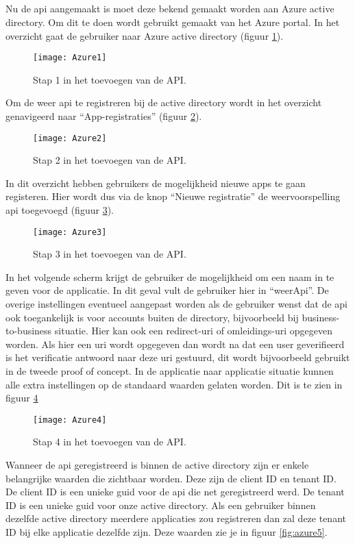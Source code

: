 \subsection{}
Nu de api aangemaakt is moet deze bekend gemaakt worden aan Azure active directory. Om dit te doen wordt gebruikt gemaakt van het Azure portal. In het overzicht gaat de gebruiker naar Azure active directory (figuur \ref{fig:azure1}).
\begin{figure}[H]
	\centering
	\texttt{[image: Azure1]} 
	\caption[BeginAzure]{Stap 1 in het toevoegen van de API.}
	\label{fig:azure1}
\end{figure}
Om de weer api te registreren bij de active directory wordt in het overzicht genavigeerd naar “App-registraties” (figuur \ref{fig:azure2}).
\begin{figure}[H]
	\centering
	\texttt{[image: Azure2]} 
	\caption[Azure2]{Stap 2 in het toevoegen van de API.}
	\label{fig:azure2}
\end{figure}
In dit overzicht hebben gebruikers de mogelijkheid nieuwe apps te gaan registeren. Hier wordt dus via de knop “Nieuwe registratie” de weervoorspelling api toegevoegd (figuur \ref{fig:azure3}).
\begin{figure}[H]
	\centering
	\texttt{[image: Azure3]} 
	\caption[Azure3]{Stap 3 in het toevoegen van de API.}
	\label{fig:azure3}
\end{figure}
In het volgende scherm krijgt de gebruiker de mogelijkheid om een naam in te geven voor de applicatie. In dit geval vult de gebruiker hier in “weerApi”. De overige instellingen eventueel aangepast worden als de gebruiker wenst dat de api ook toegankelijk is voor accounts buiten de directory, bijvoorbeeld bij business-to-business situatie. Hier kan ook een redirect-uri of omleidings-uri opgegeven worden. Als hier een uri wordt opgegeven dan wordt na dat een user geverifieerd is het verificatie antwoord naar deze uri gestuurd, dit wordt bijvoorbeeld gebruikt in de tweede proof of concept. In de applicatie naar applicatie situatie kunnen alle extra instellingen op de standaard waarden gelaten worden. Dit is te zien in figuur \ref{fig:azure4}
\begin{figure}[H]
	\centering
	\texttt{[image: Azure4]} 
	\caption[Azure4]{Stap 4 in het toevoegen van de API.}
	\label{fig:azure4}
\end{figure}\newpage
Wanneer de api geregistreerd is binnen de active directory zijn er enkele belangrijke waarden die zichtbaar worden. Deze zijn de client ID en tenant ID. De client ID is een unieke guid voor de api die net geregistreerd werd. De tenant ID is een unieke guid voor onze active directory. Als een gebruiker binnen dezelfde active directory meerdere applicaties zou registreren dan zal deze tenant ID bij elke applicatie dezelfde zijn. Deze waarden zie je in figuur \ref{fig:azure5}.
